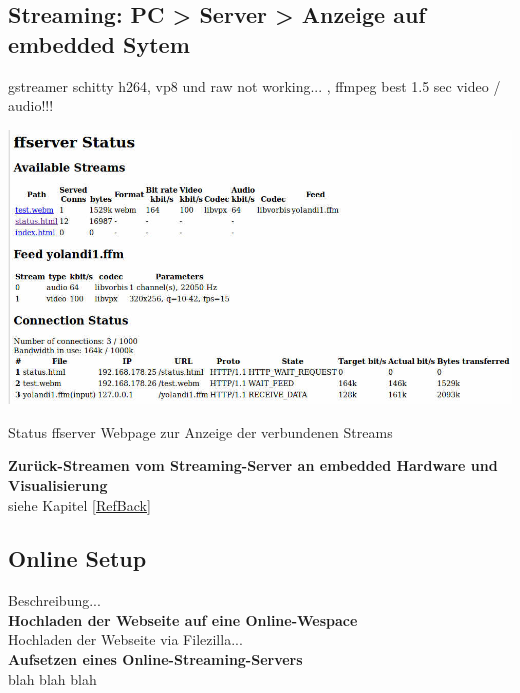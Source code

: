 \subsection{Streaming: PC > Server > Anzeige auf embedded Sytem}




gstreamer schitty h264, vp8 und raw not working...
, ffmpeg best 1.5 sec video / audio!!!\\

\begin{minipage}{\textwidth}
    \begin{center}
        \includegraphics[scale=0.5]{img/statusff.jpg} 
    \end{center}
\end{minipage}
\begin{center}
Status ffserver Webpage zur Anzeige der verbundenen Streams
\end{center}


\textbf{Zurück-Streamen vom Streaming-Server an embedded Hardware und Visualisierung}\\
siehe Kapitel \ref{RefBack}


\subsection{Online Setup}
Beschreibung...\\

\textbf{Hochladen der Webseite auf eine Online-Wespace}\\

Hochladen der Webseite via Filezilla...\\

\textbf{Aufsetzen eines Online-Streaming-Servers}\\
blah blah blah\\

